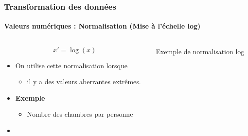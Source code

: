 \documentclass[xcolor=table]{beamer}
\begin{document}
\begin{frame}
	\frametitle{Transformation des données}
	\framesubtitle{Valeurs numériques : Normalisation (Mise à l'échelle log)}
	
	\begin{columns}
		\begin{column}{.5\textwidth}
			
	\[x' = \log(x)	\]
	
	\begin{itemize}
		\item On utilise cette normalisation lorsque
		\begin{itemize}
			\item il y a des valeurs aberrantes extrêmes.
		\end{itemize}
		\item \textbf{Exemple}
		\begin{itemize}
			\item Nombre des chambres par personne
		\end{itemize}
		\item {}
	\end{itemize}
	\end{column}
	\begin{column}{.5\textwidth}
		
		\begin{center}
			Exemple de normalisation log \cite{2021-google-prep}
		\end{center}
	\end{column}
\end{columns}

\end{frame}
\end{document}
